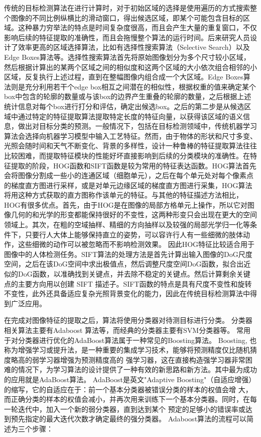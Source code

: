传统的目标检测算法在进行计算时，对于初始区域的选择是使用遍历的方式搜索整个图像的不同比例纵横比的滑动窗口，得出候选区域，即某个可能包含目标的区域\cite{胡伏原2020基于卷积神经网络的目标检测算法综述,kira1992feature}。这种暴力穷举法的特点是时间复杂度很高，而且会产生大量的重复窗口，不仅影响后续的特征提取的准确性，而且会拖慢整个算法的运行时间。后来研究人员设计了效率更高的区域选择算法，比如有选择性搜索算法（Selective Search）\cite{uijlings2013selective}以及Edge Boxes算法\cite{zitnick2014edge}等。选择性搜索算法首先将原始图像划分为多个尺寸较小区域，然后根据计算出的某两个区域之间的相似度和这两个区域的大小依次组合相邻的小区域，反复执行上述过程，直到在整幅图像内组合成一个大区域。Edge Boxes算法则是充分利用若干个edge box相互之间潜在的相似性，根据权重的值来确定某个box中包含的轮廓的数量或与该box的边界产生重叠的轮廓的数量，之后根据上述统计信息对每个box进行打分和评估，确定出候选box。之后的第二步是从候选区域中通过特定的特征提取算法提取特定长度的特征向量，以获得该区域的语义信息，做出对目标分类的预测。一般情况下，包括在目标检测领域中，传统机器学习算法会选择向机器学习模型中输入工艺特征。然而，由于物体的形状和尺寸多变、光照会随时间和天气不断变化、背景的多样性，设计一种鲁棒的特征提取算法往往比较困难，而提取特征模块的性能好坏直接影响到后续的分类模块的准确性。在特征提取的阶段，HOG函数\cite{he1990texture}和SIFT函数\cite{lowe1999object}是较为常用的特征表达函数。HOG算法首先会将图像分割成一些小的连通区域（细胞单元），之后在每个单元处对每个像素点的梯度直方图进行采样，或是对单元边缘区域的梯度直方图进行采集，HOG算法将用这种方式获取的直方图称作该单元的特征。与其他的特征描述方法相比，HOG有很多优点。首先，由于HOG是在图像的局部方格单元上操作，所以它对图像几何的和光学的形变都能保持很好的不变性，这两种形变只会出现在更大的空间领域上。其次，在粗的空域抽样、精细的方向抽样以及较强的局部光学归一化等条件下，只要行人大体上能够保持直立的姿势，可以容许行人有一些细微的肢体动作，这些细微的动作可以被忽略而不影响检测效果。
因此HOG特征比较适合用于图像中的人体检测任务。SIFT算法的处理方法是首先计算出输入图像的DoG尺度空间，之后在该DoG空间中求出极值点，然后调整尺度空间DoG函数，拟合出近似的DoG函数，以准确找到关键点，并去除不稳定的关键点。然后计算剩余关键点的主要方向用以创建 SIFT 描述子。SIFT函数的特点是具有尺度不变性和旋转不变性，此外还具备适应复杂光照背景变化的能力，因此在传统目标检测算法中得到广泛应用。

在完成对图像特征的提取之后，算法将使用分类器对待测目标进行分类。
分类器相关算法主要有Adaboost\cite{freund1997decision} 算法等，而经典的分类器主要有SVM\cite{cortes1995support}分类器等。
常用于对分类器进行优化的AdaBoost算法属于一种常见的Boosting算法。
Boosting, 也称为增强学习或提升法，是⼀种重要的集成学习技术，能够将预测精度仅⽐随机猜度略⾼的弱学习器增强为预测精度⾼的
强学习器，这在直接构造强学习器⾮常困难的情况下，为学习算法的设计提供了⼀种有效的新思路和新⽅法。其中最为成功的应⽤就是AdaBoost算法。
AdaBoost是英⽂"Adaptive Boosting"（⾃适应增强）的缩写，它的⾃适应在于：前⼀个基本分类器被错误分类的样本的权值会增
⼤，⽽正确分类的样本的权值会减⼩，并再次⽤来训练下⼀个基本分类器。同时，在每⼀轮迭代中，加⼊⼀个新的弱分类器，直到达到某个
预定的⾜够⼩的错误率或达到预先指定的最⼤迭代次数才确定最终的强分类器。
Adaboost算法的流程可以简述为三个步骤：

